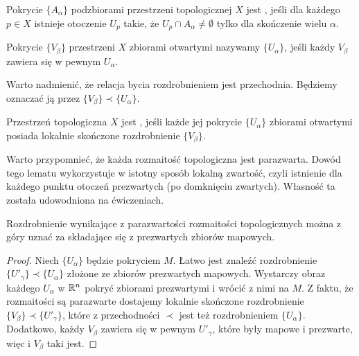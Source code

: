 \begin{definition} Pokrycie $\{A_\alpha\}$ podzbiorami przestrzeni topologicznej $X$ jest , jeśli dla każdego $p\in X$ istnieje otoczenie $U_p$ takie, że $U_p\cap A_\alpha\neq\emptyset$ tylko dla skończenie wielu $\alpha$.
\end{definition}

\begin{definition}[rozdrobnienie] Pokrycie $\{V_\beta\}$ przestrzeni $X$ zbiorami otwartymi nazywamy  $\{U_\alpha\}$, jeśli każdy $V_\beta$ zawiera się w pewnym $U_\alpha$.
\end{definition}

Warto nadmienić, że relacja bycia rozdrobnieniem jest przechodnia. Będziemy oznaczać ją przez $\{V_\beta\}\prec\{U_\alpha\}$.

\begin{definition} Przestrzeń topologiczna $X$ jest , jeśli każde jej pokrycie $\{U_\alpha\}$ zbiorami otwartymi posiada lokalnie skończone rozdrobnienie $\{V_\beta\}$.
\end{definition}

Warto przypomnieć, że każda rozmaitość topologiczna jest parazwarta. Dowód tego lematu wykorzystuje w istotny sposób lokalną zwartość, czyli istnienie dla każdego punktu otoczeń prezwartych (po domknięciu zwartych). Własność ta została udowodniona na ćwiczeniach.

\begin{remark}\label{uwaga:2.4}
Rozdrobnienie wynikające z parazwartości rozmaitości topologicznych można z góry uznać za składające się z prezwartych zbiorów mapowych.
\end{remark}

\begin{proof}
Niech $\{U_\alpha\}$ będzie pokryciem $M$. Łatwo jest znaleźć rozdrobnienie $\{U'_\gamma\}\prec\{U_\alpha\}$ złożone ze zbiorów prezwartych mapowych. Wystarczy obraz każdego $U_\alpha$ w $\mathbb{R}^n$ pokryć zbiorami prezwartymi i wrócić z nimi na $M$. Z faktu, że rozmaitości są parazwarte dostajemy lokalnie skończone rozdrobnienie $\{V_\beta\}\prec\{U'_\gamma\}$, które z przechodności $\prec$ jest też rozdrobnieniem $\{U_\alpha\}$. Dodatkowo, każdy $V_\beta$ zawiera się w pewnym $U'_\gamma$, które były mapowe i prezwarte, więc i $V_\beta$ taki jest.
\end{proof}

